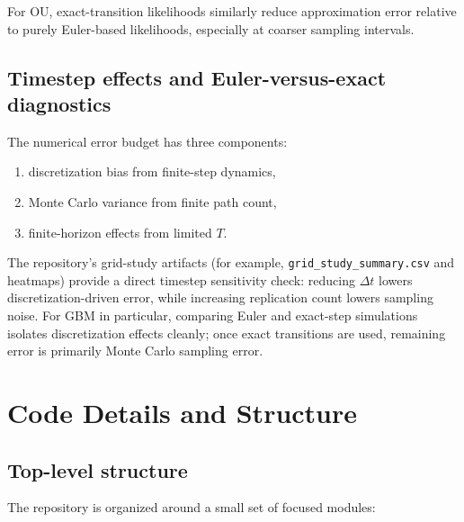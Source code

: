 \documentclass[11pt]{article}
\begin{document}
For OU, exact-transition likelihoods similarly reduce approximation error relative to purely Euler-based likelihoods, especially at coarser sampling intervals.

\subsection{Timestep effects and Euler-versus-exact diagnostics}

The numerical error budget has three components:
\begin{enumerate}[leftmargin=1.5em]
  \item discretization bias from finite-step dynamics,
  \item Monte Carlo variance from finite path count,
  \item finite-horizon effects from limited $T$.
\end{enumerate}

The repository's grid-study artifacts (for example, \texttt{grid\_study\_summary.csv} and heatmaps) provide a direct timestep sensitivity check: reducing $\Delta t$ lowers discretization-driven error, while increasing replication count lowers sampling noise. For GBM in particular, comparing Euler and exact-step simulations isolates discretization effects cleanly; once exact transitions are used, remaining error is primarily Monte Carlo sampling error.

\section{Code Details and Structure}

\subsection{Top-level structure}

The repository is organized around a small set of focused modules:
\end{document}
